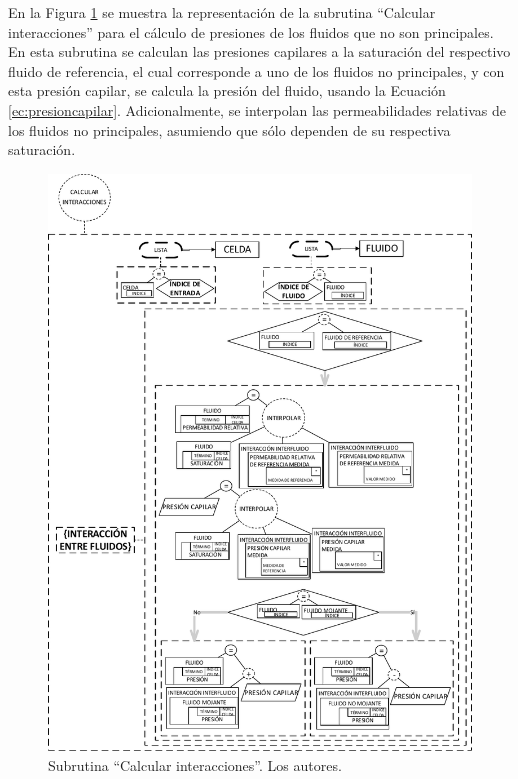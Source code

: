 En la Figura \ref{fig:CapillaryPressure} se muestra la representación de la subrutina ``Calcular interacciones'' para el cálculo de presiones de los fluidos que no son principales. En esta subrutina se calculan las presiones capilares a la saturación del respectivo fluido de referencia, el cual corresponde a uno de los fluidos no principales, y con esta presión capilar, se calcula la presión del fluido, usando la Ecuación \ref{ec:presioncapilar}. Adicionalmente, se interpolan las permeabilidades relativas de los fluidos no principales, asumiendo que sólo dependen de su respectiva saturación.

\begin{figure}[h]
	\centering%
	\includegraphics[width=0.9\linewidth]{Fig/CalcularInteracciones.pdf}%
	\caption[Subrutina ``Calcular interacciones''.]{Subrutina ``Calcular interacciones''. Los autores.}
	\label{fig:CapillaryPressure}
\end{figure}

